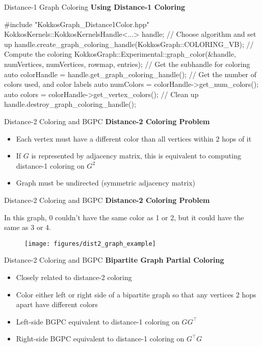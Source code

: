 \begin{frame}[fragile]{Distance-1 Graph Coloring}
\textbf{Using Distance-1 Coloring}

\begin{code}
  #include "KokkosGraph_Distance1Color.hpp"
  KokkosKernels::KokkosKernelsHandle<...> handle;
  // Choose algorithm and set up
  handle.create_graph_coloring_handle(KokkosGraph::COLORING_VB);
  // Compute the coloring
  KokkosGraph::Experimental::graph_color(&handle,
    numVertices, numVertices, rowmap, entries);
  // Get the subhandle for coloring
  auto colorHandle = handle.get_graph_coloring_handle();
  // Get the number of colors used, and color labels
  auto numColors = colorHandle->get_num_colors();
  auto colors = colorHandle->get_vertex_colors();
  // Clean up
  handle.destroy_graph_coloring_handle();
\end{code}
\end{frame}

\begin{frame}[fragile]{Distance-2 Coloring and BGPC}
\textbf{Distance-2 Coloring Problem}

\begin{itemize}
  \item Each vertex must have a different color than all vertices within 2 hops of it
  \item If $G$ is represented by adjacency matrix, this is equivalent to computing distance-1 coloring on $G^2$
  \item Graph must be undirected (symmetric adjacency matrix)
\end{itemize}
\end{frame}

\begin{frame}[fragile]{Distance-2 Coloring and BGPC}
\textbf{Distance-2 Coloring Problem}

In this graph, 0 couldn't have the same color as 1 or 2, but it could have the same as 3 or 4.
\begin{figure}[h]
\texttt{[image: figures/dist2\_graph\_example]}
\end{figure}
\end{frame}

\begin{frame}[fragile]{Distance-2 Coloring and BGPC}
\textbf{Bipartite Graph Partial Coloring}

\begin{itemize}
  \item Closely related to distance-2 coloring
  \item Color either left or right side of a bipartite graph so that any vertices 2 hops apart have different colors
  \item Left-side BGPC equivalent to distance-1 coloring on $GG^\top$
  \item Right-side BGPC equivalent to distance-1 coloring on $G^{\top}G$
\end{itemize}
\end{frame}

